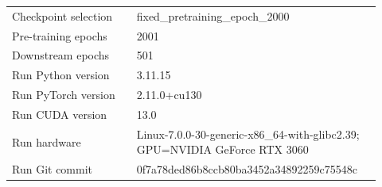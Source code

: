 \begin{table}[p]
\begin{tabular}{p{0.32\linewidth}p{0.60\linewidth}}
Checkpoint selection & fixed\_pretraining\_epoch\_2000 \\
Pre-training epochs & 2001 \\
Downstream epochs & 501 \\
Run Python version & 3.11.15 \\
Run PyTorch version & 2.11.0+cu130 \\
Run CUDA version & 13.0 \\
Run hardware & Linux-7.0.0-30-generic-x86\_64-with-glibc2.39; GPU=NVIDIA GeForce RTX 3060 \\
Run Git commit & 0f7a78ded86b8ccb80ba3452a34892259c75548c \\
\bottomrule
\end{tabular}
\end{table}
